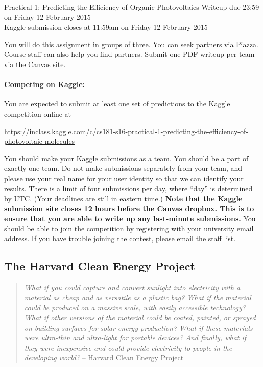\documentclass[12pt]{article}
\begin{document}
	\begin{center}
		{\Large Practical 1: Predicting the Efficiency of Organic Photovoltaics}
		Writeup due 23:59 on Friday 12 February 2015\\
		Kaggle submission closes at 11:59am on Friday 12 February 2015
	\end{center}
	
	You will do this assignment in groups of three. You can seek partners via Piazza.  Course staff can also help you find partners.  Submit one PDF writeup per team via the Canvas site.
	
	\paragraph{Competing on Kaggle:} You are expected to submit at least one set of predictions to the Kaggle competition online at
	\begin{center}
		\url{https://inclass.kaggle.com/c/cs181-s16-practical-1-predicting-the-efficiency-of-photovoltaic-molecules}
	\end{center}
	You should make your Kaggle submissions as a team.  You should be a part of exactly one team. Do not make submissions separately from your team, and please use your real name for your user identity so that we can identify your results.  There is a limit of four submissions per day, where ``day'' is determined by UTC.  (Your deadlines are still in eastern time.)  \textbf{Note that the Kaggle submission site closes 12 hours before the Canvas dropbox.  This is to ensure that you are able to write up any last-minute submissions.}  You should be able to join the competition by registering with your university email address.  If you have trouble joining the contest, please email the staff list.
	
	\subsection*{The Harvard Clean Energy Project}
	
	\begin{quote}
		\emph{What if you could capture and convert sunlight into electricity with a material as cheap and as versatile as a plastic bag? What if the material could be produced on a massive scale, with easily accessible technology? What if other versions of the material could be coated, painted, or sprayed on building surfaces for solar energy production? What if these materials were ultra-thin and ultra-light for portable devices? And finally, what if they were inexpensive and could provide electricity to people in the developing world?} -- Harvard Clean Energy Project
	\end{quote}
	
\end{document}
